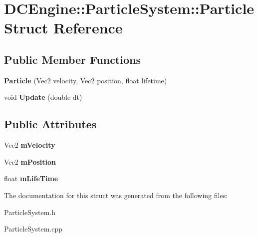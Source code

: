 \hypertarget{structDCEngine_1_1ParticleSystem_1_1Particle}{\section{D\-C\-Engine\-:\-:Particle\-System\-:\-:Particle Struct Reference}
\label{structDCEngine_1_1ParticleSystem_1_1Particle}
}
\subsection*{Public Member Functions}
\begin{DoxyCompactItemize}
\item 
\hypertarget{structDCEngine_1_1ParticleSystem_1_1Particle_ac90503fa09c80588ce561f1b778a24af}{{\bfseries Particle} (Vec2 velocity, Vec2 position, float lifetime)}\label{structDCEngine_1_1ParticleSystem_1_1Particle_ac90503fa09c80588ce561f1b778a24af}

\item 
\hypertarget{structDCEngine_1_1ParticleSystem_1_1Particle_ac0d5a44d4d47fc07fa4d0240f703e23c}{void {\bfseries Update} (double dt)}\label{structDCEngine_1_1ParticleSystem_1_1Particle_ac0d5a44d4d47fc07fa4d0240f703e23c}

\end{DoxyCompactItemize}
\subsection*{Public Attributes}
\begin{DoxyCompactItemize}
\item 
\hypertarget{structDCEngine_1_1ParticleSystem_1_1Particle_a51f0caf523411c49dcaa3cb5cea39d73}{Vec2 {\bfseries m\-Velocity}}\label{structDCEngine_1_1ParticleSystem_1_1Particle_a51f0caf523411c49dcaa3cb5cea39d73}

\item 
\hypertarget{structDCEngine_1_1ParticleSystem_1_1Particle_aa378cf608930dc0f80df1026ebdf2de8}{Vec2 {\bfseries m\-Position}}\label{structDCEngine_1_1ParticleSystem_1_1Particle_aa378cf608930dc0f80df1026ebdf2de8}

\item 
\hypertarget{structDCEngine_1_1ParticleSystem_1_1Particle_af12843d484a74e4b2540dba757796afd}{float {\bfseries m\-Life\-Time}}\label{structDCEngine_1_1ParticleSystem_1_1Particle_af12843d484a74e4b2540dba757796afd}

\end{DoxyCompactItemize}


The documentation for this struct was generated from the following files\-:\begin{DoxyCompactItemize}
\item 
Particle\-System.\-h\item 
Particle\-System.\-cpp\end{DoxyCompactItemize}
